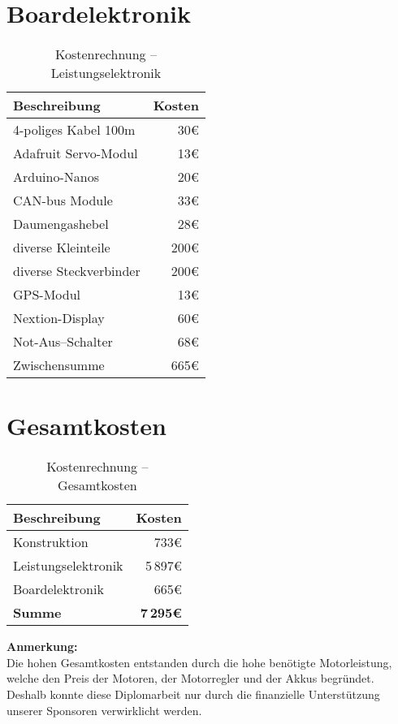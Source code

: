 \section{Boardelektronik}
\begin{table}[H]
    \centering
    \begin{tabular}{|l|r|}
        \hline
        \textbf{Beschreibung} & \textbf{Kosten}\\\hline
        4-poliges Kabel 100m & 30\euro\\
        Adafruit Servo-Modul & 13\euro\\
        Arduino-Nanos & 20\euro\\
        CAN-bus Module & 33\euro\\
        Daumengashebel & 28\euro\\
        diverse Kleinteile & 200\euro\\
        diverse Steckverbinder & 200\euro\\
        GPS-Modul & 13\euro\\
        Nextion-Display & 60\euro\\
        Not-Aus--Schalter & 68\euro\\        
        \hline
        Zwischensumme & 665\euro\\\hline
    \end{tabular}
    \caption{Kostenrechnung -- Leistungselektronik}
\end{table}

\section{Gesamtkosten}
\begin{table}[H]
    \centering
    \begin{tabular}{|l|r|}
        \hline
        \textbf{Beschreibung} & \textbf{Kosten}\\\hline
        Konstruktion & 733\euro\\
        Leistungselektronik & 5\,897\euro\\
        Boardelektronik & 665\euro\\
        \hline
        \textbf{Summe} & \textbf{7\,295\euro}\\\hline
    \end{tabular}
    \caption{Kostenrechnung -- Gesamtkosten}
\end{table}

\textbf{Anmerkung:}\\
Die hohen Gesamtkosten entstanden durch die hohe benötigte Motorleistung, welche den Preis der Motoren, der Motorregler und der Akkus begründet. Deshalb konnte diese Diplomarbeit nur durch die finanzielle Unterstützung unserer Sponsoren verwirklicht werden.
